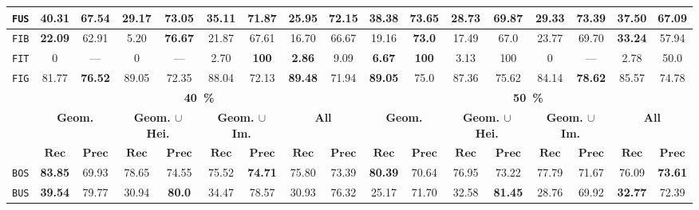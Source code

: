 \begin{sidewaystable}
\begin{center}
\begin{tabular}{|c | c c | c c | c c | c c || c c | c c | c c | c c |}
                    \hline
                    \texttt{FUS} & \textbf{40.31} & 67.54 & 29.17 & \textbf{73.05} & 35.11 & 71.87 & 25.95 & 72.15 & \textbf{38.38} & \textbf{73.65} & 28.73 & 69.87 & 29.33 & 73.39 & 37.50 & 67.09 \\
                    \hline
                    \texttt{FIB} & \textbf{22.09} & 62.91 & 5.20 & \textbf{76.67} & 21.87 & 67.61 & 16.70 & 66.67 & 19.16 & \textbf{73.0} & 17.49 & 67.0 & 23.77 & 69.70 & \textbf{33.24} & 57.94 \\
                    \hline
                    \texttt{FIT} & 0 & --- & 0 & --- & 2.70 & \textbf{100} & \textbf{2.86} & 9.09 & \textbf{6.67} & \textbf{100} & 3.13 & 100 & 0 & --- & 2.78 & 50.0 \\
                    \hline
                    \texttt{FIG} & 81.77 & \textbf{76.52} & 89.05 & 72.35 & 88.04 & 72.13 & \textbf{89.48} & 71.94 & \textbf{89.05} & 75.0 & 87.36 & 75.62 & 84.14 & \textbf{78.62} & 85.57 & 74.78 \\
                    \hline
                    \hline
                    & \multicolumn{8}{c||}{\textbf{\SI{40}{\percent}}} & \multicolumn{8}{c|}{\textbf{\SI{50}{\percent}}}\\
                    \hline
                    &\multicolumn{2}{c|}{\textbf{Geom.}} & \multicolumn{2}{c|}{\textbf{Geom. $\cup$ Hei.}} & \multicolumn{2}{c|}{\textbf{Geom. $\cup$ Im.}} & \multicolumn{2}{c||}{\textbf{All}} & \multicolumn{2}{c|}{\textbf{Geom.}} & \multicolumn{2}{c|}{\textbf{Geom. $\cup$ Hei.}} & \multicolumn{2}{c|}{\textbf{Geom. $\cup$ Im.}} & \multicolumn{2}{x{1.5cm}|}{\textbf{All}}\\
                    \cline{2-17}
                    & \(\bm{Rec}\) & \(\bm{Prec}\) &  \(\bm{Rec}\) & \(\bm{Prec}\) &  \(\bm{Rec}\) & \(\bm{Prec}\) &  \(\bm{Rec}\) & \(\bm{Prec}\) & \(\bm{Rec}\) & \(\bm{Prec}\) &  \(\bm{Rec}\) & \(\bm{Prec}\) &  \(\bm{Rec}\) & \(\bm{Prec}\) &  \(\bm{Rec}\) & \(\bm{Prec}\) \\
                    \hline
                    \texttt{BOS} & \textbf{83.85} & 69.93 & 78.65 & 74.55 & 75.52 & \textbf{74.71} & 75.80 & 73.39 & \textbf{80.39} & 70.64 & 76.95 & 73.22 & 77.79 & 71.67 & 76.09 & \textbf{73.61} \\
                    \hline
                    \texttt{BUS} & \textbf{39.54} & 79.77 & 30.94 & \textbf{80.0} & 34.47 & 78.57 & 30.93 & 76.32 & 25.17 & 71.70 & 32.58 & \textbf{81.45} & 28.76 & 69.92 & \textbf{32.77} & 72.39 \\
                    \hline

\end{tabular}
\end{center}
\end{sidewaystable}
